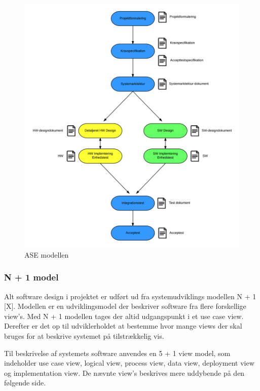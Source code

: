 \begin{figure}[H]
	\centering
	\includegraphics[width=1\textwidth]{Billeder/Udviklingsproces/ase_model}
	\caption{ASE modellen}
	\label{fig:dokument_udvikling}
\end{figure}

\newpage

\subsubsection*{N + 1 model}
Alt software design i projektet er udført ud fra systemudviklings modellen N + 1 [X]. 
Modellen er en udviklingsmodel der beskriver software fra flere forskellige view's.  
Med N + 1 modellen tages der altid udgangspunkt i et use case view. Derefter er det op til udviklerholdet at bestemme hvor mange views der skal bruges for at beskrive systemet på tilstrækkelig vis. 

Til beskrivelse af systemets software anvendes en 5 + 1 view model, som indeholder use case view, logical view, process view, data view, deployment view og implementation view. De nævnte view's beskrives mere uddybende på den følgende side. 

